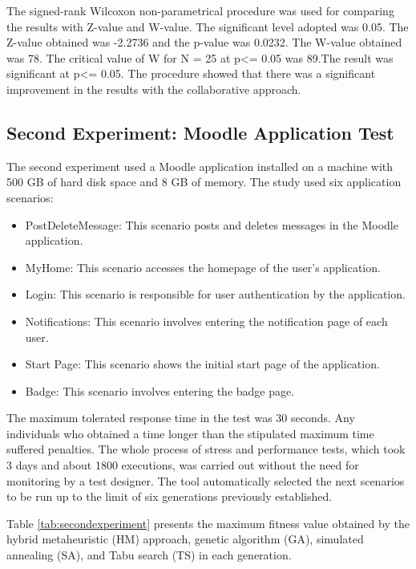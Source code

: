 \documentclass[espaco=umemeio,chapter=TITLE,twoside,openright]{abnt}
\begin{document}
The signed-rank Wilcoxon non-parametrical procedure was used for comparing the results with Z-value and W-value. The significant level adopted was 0.05. The Z-value obtained was -2.2736 and the p-value was 0.0232. The W-value obtained was 78. The critical value of W for N = 25 at p<= 0.05 was 89.The result was significant at p<= 0.05. The procedure showed that there was a significant improvement in the results with the collaborative approach.

\subsection{Second Experiment: Moodle Application Test}

The second experiment used a Moodle application installed on a machine with 500 GB of hard disk space and 8 GB of memory. The study used six application scenarios:

\begin{itemize}
\item PostDeleteMessage: This scenario posts and deletes messages in the Moodle application.
\item MyHome: This scenario accesses the homepage of the user's application.
\item Login: This scenario is responsible for user authentication by the application.
\item Notifications: This scenario involves entering the notification page of each user.
\item Start Page: This scenario shows the initial start page of the application.
\item Badge: This scenario involves entering the badge page.
\end{itemize}

The maximum tolerated response time in the test was 30 seconds.  Any  individuals who obtained a time longer than the stipulated maximum time suffered penalties.  The whole process of stress and performance tests, which took 3 days and about 1800 executions, was carried out without the need for monitoring by a test designer. The tool automatically selected the next scenarios to be run up to the limit of six generations previously established.

Table \ref{tab:secondexperiment} presents the maximum fitness value obtained by the hybrid metaheuristic (HM) approach, genetic algorithm (GA), simulated annealing (SA), and Tabu search (TS) in each generation.
\end{document}
